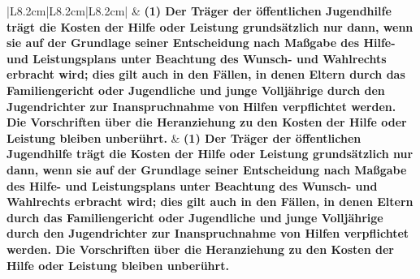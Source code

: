 \documentclass[10pt,a4paper,landscape]{article}
\begin{document}
\begin{longtable}{|L{8.2cm}|L{8.2cm}|L{8.2cm}|}
\hhline{|---|}
 & \textbf{(1) Der Träger der öffentlichen  \newline Jugendhilfe trägt die Kosten der Hilfe  \newline oder Leistung grundsätzlich nur dann,  \newline wenn sie auf der Grundlage seiner  \newline Entscheidung nach Maßgabe des Hilfe-  \newline und Leistungsplans unter Beachtung  \newline des Wunsch- und Wahlrechts erbracht  \newline wird; dies gilt auch in den Fällen, in  \newline denen Eltern durch das Familiengericht  \newline oder Jugendliche und junge Volljährige  \newline durch den Jugendrichter zur  \newline Inanspruchnahme von Hilfen  \newline verpflichtet werden. Die Vorschriften  \newline über die Heranziehung zu den Kosten  \newline der Hilfe oder Leistung bleiben  \newline unberührt. } & \textbf{(1) Der Träger der öffentlichen  \newline Jugendhilfe trägt die Kosten der Hilfe  \newline oder Leistung grundsätzlich nur dann,  \newline wenn sie auf der Grundlage seiner  \newline Entscheidung nach Maßgabe des Hilfe-  \newline und Leistungsplans unter Beachtung  \newline des Wunsch- und Wahlrechts erbracht  \newline wird; dies gilt auch in den Fällen, in  \newline denen Eltern durch das Familiengericht  \newline oder Jugendliche und junge Volljährige  \newline durch den Jugendrichter zur  \newline Inanspruchnahme von Hilfen  \newline verpflichtet werden. Die Vorschriften  \newline über die Heranziehung zu den Kosten  \newline der Hilfe oder Leistung bleiben  \newline unberührt. } \\

\end{longtable}
\end{document}
